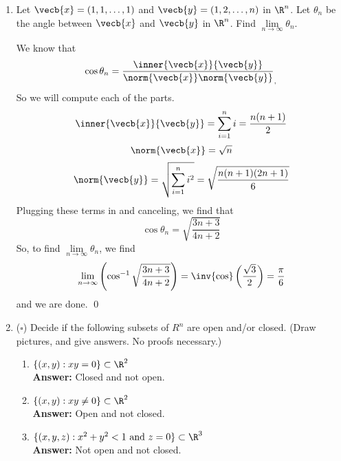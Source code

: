 \documentclass[letterpaper]{article}
\begin{document}
\begin{enumerate}
\begin{proof}($\implies$)
Suppose that $\norm{\vecb{x}+\vecb{y}}^2=\norm{\vecb{x}}^2+\norm{\vecb{y}}^2$. Then, 
\[\begin{array}{rcl}
\norm{\vecb{x}+\vecb{y}}^2&=&\norm{\vecb{x}}^2+\norm{\vecb{y}}^2\\
\norm{\vecb{x}}^2+2\inner{\vecb{x}}{\vecb{y}}+\norm{\vecb{y}}^2&=&\norm{\vecb{x}}^2+\norm{\vecb{y}}^2\\
2\inner{\vecb{x}}{\vecb{y}}&=&0\\
\end{array}\]
Thus, $\vecb{x}$ and $\vecb{y}$ are orthogonal by definition. 
\end{proof}

\item Let $\vecb{x}=(1,1,\ldots, 1)$ and $\vecb{y}=(1,2,\ldots, n)$ in $\R^n$. Let $\theta_n$ be the angle between $\vecb{x}$ and $\vecb{y}$ in $\R^n$. Find $\lim\limits_{n\to\infty}\theta_n$. 

We know that 
$$\cos\theta_n=\frac{\inner{\vecb{x}}{\vecb{y}}}{\norm{\vecb{x}}\norm{\vecb{y}}}_,$$
So we will compute each of the parts. 
$$\inner{\vecb{x}}{\vecb{y}}=\sum_{i=1}^ni=\frac{n(n+1)}{2}$$
$$\norm{\vecb{x}}=\sqrt{n}$$
$$\norm{\vecb{y}}=\sqrt{\sum_{i=1}^n i^2}=\sqrt{\frac{n(n+1)(2n+1)}{6}}$$
Plugging these terms in and canceling, we find that 
$$\cos\theta_n=\sqrt{\frac{3n+3}{4n+2}}$$
So, to find $\lim\limits_{n\to\infty}\theta_n$, we find 
$$\lim\limits_{n\to\infty}\left(\cos^{-1}\sqrt{\frac{3n+3}{4n+2}}\right)=\inv{\cos}\left(\frac{\sqrt{3}}{2}\right)=\frac{\pi}{6}$$
and we are done. \qed

\pagebreak
\item ($\square$) Decide if the following subsets of $R^n$ are open and/or closed. (Draw pictures, and give answers. No proofs necessary.)

	\begin{multicols}{2}	
	\begin{enumerate}[label=(\alph*)]
	\item $\{(x,y):xy=0\}\subset\R^2$\\
	\textbf{Answer:} Closed and not open. 
	\qedwhite
	
	\item $\{(x,y):xy\neq0\}\subset\R^2$\\
	\textbf{Answer:} Open and not closed. 
	\qedwhite
	
	\item $\{(x,y,z):x^2+y^2<1 \text{ and } z=0\}\subset\R^3$\\
	\textbf{Answer:} Not open and not closed. 
	\qedwhite
	

\end{enumerate}
\end{multicols}
\end{enumerate}
\end{document}
